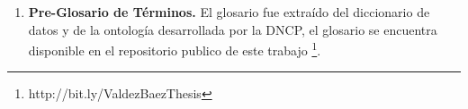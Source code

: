 \begin{enumerate}
\begin{enumerate}
        \item Gracias a la ontología se podrán responder las mismas preguntas que se responden a través de los datos publicados en formato de JSON y se podrán responder preguntas de todas las fases del proceso licitatorio.
        \item Debe ser compatible con la versión 1 del OCDS.
        \item Los datos deberán poder ser enriquecidos con otras fuentes de datos provenientes de la DNCP y también fuentes externas como Wikidata o DBpedia.
    \end{enumerate}
\item \textbf{Pre-Glosario de Términos.} El glosario fue extraído del diccionario de datos y de la ontología desarrollada por la DNCP, el glosario se encuentra disponible en el repositorio publico de este trabajo \footnote{http://bit.ly/ValdezBaezThesis}.
\end{enumerate}

